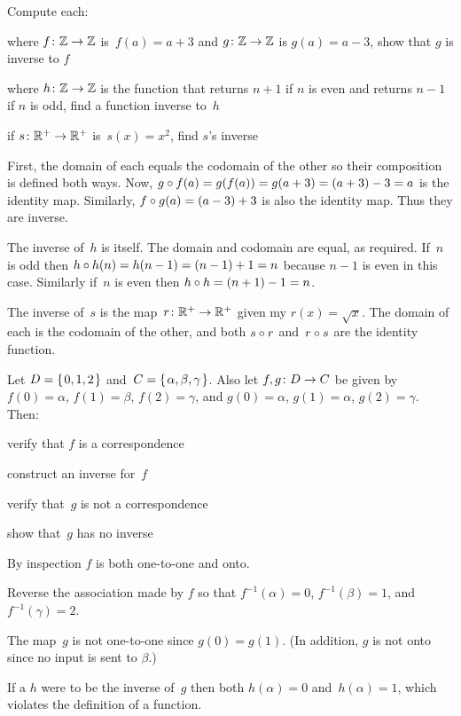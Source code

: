 \documentclass{ibl}  %
\begin{document}
\begin{problem} 
Compute each:
\begin{items}
\item 
  where $\mbox{$f\colon \mathbb{Z}\to \mathbb{Z}$}$ is~$f(a)=a+3$ and 
  $\mbox{$g\colon \mathbb{Z}\to \mathbb{Z}$}$ is $g(a)=a-3$,
  show that $g$ is inverse to $f$
\item
  where $\mbox{$h\colon \mathbb{Z}\to \mathbb{Z}$}$ is the function that returns
  $n+1$ if $n$ is even and returns $n-1$ if $n$ is odd,
  find a function inverse to~$h$
\item
  if $\mbox{$s\colon \mathbb{R}^+\to \mathbb{R}^+$}$ is~$s(x)=x^2$,
  find $s$'s inverse
\end{items}
\begin{ans}
\begin{items}
\item
  First, the domain of each equals the codomain of the other
  so their composition is defined both ways.
  Now, $g\mathbin{\circ} f(a)=g(f(a))=g(a+3)=(a+3)-3=a$
  is the identity map.
  Similarly, $f\mathbin{\circ} g(a)=(a-3)+3$ is also the identity map.
  Thus they are inverse.  
\item
  The inverse of~$h$ is itself.
  The domain and codomain are equal, as required. 
  If~$n$ is odd then $h\mathbin{\circ} h(n)=h(n-1)=(n-1)+1=n$ because 
  $n-1$ is even in this case.
  Similarly if~$n$ is even then $h\mathbin{\circ} h=(n+1)-1=n$.  
\item
  The inverse of~$s$ is the map~$\mbox{$r\colon \mathbb{R}^+\to \mathbb{R}^+$}$ given my 
  $r(x)=\sqrt{x}$.
  The domain of each is the codomain of the other,
  and both $s\mathbin{\circ} r$ and~$r\mathbin{\circ} s$ are the identity function.  
\end{items}
\end{ans}
\end{problem}

\begin{problem}
Let $D=\mbox{$\{\hspace{0.1em}0,1,2\hspace{0.1em}\}$}$ and~$C=\mbox{$\{\hspace{0.1em}\alpha,\beta,\gamma\hspace{0.1em}\}$}$.
Also let $\mbox{$f,g\colon D\to C$}$ be given by
$f(0)=\alpha$, $f(1)=\beta$, $f(2)=\gamma$, and
$g(0)=\alpha$, $g(1)=\alpha$, $g(2)=\gamma$.
Then:
\begin{items}
\item verify that $f$ is a correspondence
\item construct an inverse for~$f$\!
\item verify that~$g$ is not a correspondence
\item show that~$g$ has no inverse 
\end{items}
\begin{answer}
\begin{items}
\item By inspection $f$ is both one-to-one and onto.
\item Reverse the association made by $f$ so that $f^{-1}(\alpha)=0$,
  $f^{-1}(\beta)=1$, and~$f^{-1}(\gamma)=2$.
\item The map~$g$ is not one-to-one since $g(0)=g(1)$.
  (In addition, $g$ is not onto since no input is sent to $\beta$.) 
\item If a $h$ were to be the inverse of~$g$
  then both $h(\alpha)=0$ and~$h(\alpha)=1$, 
  which violates the definition of a function.   
\end{items}
\end{answer}
\end{problem}
\end{document}
